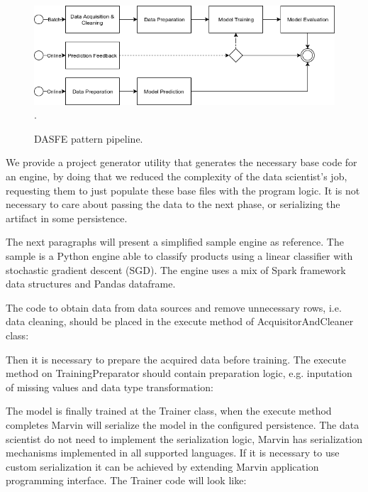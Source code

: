 \documentclass[twoside,11pt]{article}
\begin{document}
\begin{figure}[h]
\centering
\includegraphics[scale=0.6]{fig/marvin-dase.png}
\DeclareGraphicsExtensions.
\caption{DASFE pattern pipeline.}
\label{fig_dase}
\end{figure}

We provide a project generator utility that generates the necessary base code for an engine, by doing that we reduced the complexity of the data scientist's job, requesting them to just populate these base files with the program logic. It is not necessary to care about passing the data to the next phase, or serializing the artifact in some persistence. 

The next paragraphs will present a simplified sample engine as reference. The sample is a Python engine able to classify products using a linear classifier with stochastic gradient descent (SGD). The engine uses a mix of Spark framework data structures and Pandas dataframe.

The code to obtain data from data sources and remove unnecessary rows, i.e. data cleaning, should be placed in the execute method of AcquisitorAndCleaner class:


Then it is necessary to prepare the acquired data before training. The execute method on TrainingPreparator should contain preparation logic, e.g. inputation of missing values and data type transformation:



The model is finally trained at the Trainer class, when the execute method completes Marvin will serialize the model in the configured persistence. The data scientist do not need to implement the serialization logic, Marvin has serialization mechanisms implemented in all supported languages. If it is necessary to use custom serialization it can be achieved by extending Marvin application programming interface. The Trainer code will look like:


\end{document}
